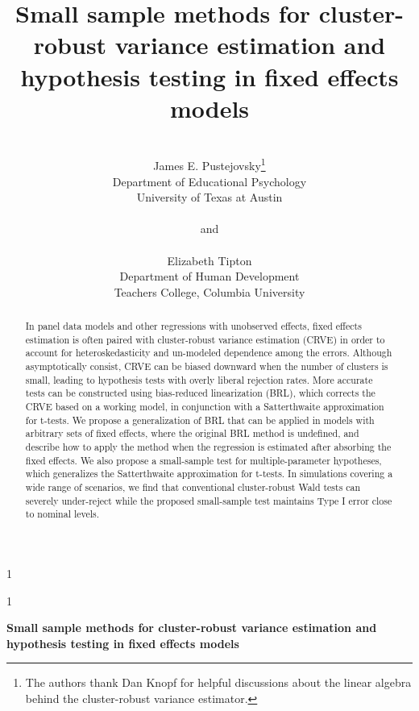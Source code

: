 \documentclass[12pt]{article}\usepackage[]{graphicx}\usepackage[]{color}
\newcommand{\blind}{1}
\begin{document}
\def\spacingset#1{\renewcommand{\baselinestretch}%
{#1}\small\normalsize} \spacingset{1}



\blind
{
  \title{\bf Small sample methods for cluster-robust variance estimation and hypothesis testing in fixed effects models}
  \author{\\James E. Pustejovsky\thanks{
    The authors thank Dan Knopf for helpful discussions about the linear algebra behind the cluster-robust variance estimator.}\hspace{.2cm}\\
    Department of Educational Psychology \\ 
    University of Texas at Austin\\ \\
    and \\ \\
    Elizabeth Tipton \\
    Department of Human Development \\ 
    Teachers College, Columbia University}
  \maketitle
} \fi

\blind
{
  \bigskip
  \bigskip
  \bigskip
  \begin{center}
    {\LARGE\bf Small sample methods for cluster-robust variance estimation and hypothesis testing in fixed effects models}
\end{center}
  \medskip
} \fi

\bigskip


\begin{abstract}
In panel data models and other regressions with unobserved effects, fixed effects estimation is often paired with cluster-robust variance estimation (CRVE) in order to account for heteroskedasticity and un-modeled dependence among the errors. Although asymptotically consist, CRVE can be biased downward when the number of clusters is small, leading to hypothesis tests with overly liberal rejection rates. More accurate tests can be constructed using bias-reduced linearization (BRL), which corrects the CRVE based on a working model, in conjunction with a Satterthwaite approximation for t-tests. We propose a generalization of BRL that can be applied in models with arbitrary sets of fixed effects, where the original BRL method is undefined, and describe how to apply the method when the regression is estimated after absorbing the fixed effects. We also propose a small-sample test for multiple-parameter hypotheses, which generalizes the Satterthwaite approximation for t-tests. In simulations covering a wide range of scenarios, we find that conventional cluster-robust Wald tests can severely under-reject while the proposed small-sample test maintains Type I error close to nominal levels. 
\end{abstract}
\end{document}
